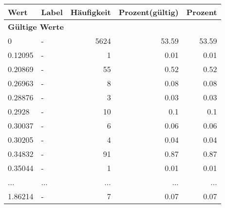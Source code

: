      \begin{longtable}{lXrrr}
     \toprule
     \textbf{Wert} & \textbf{Label} & \textbf{Häufigkeit} & \textbf{Prozent(gültig)} & \textbf{Prozent} \\
     \endhead
     \midrule
     \multicolumn{5}{l}{\textbf{Gültige Werte}}\\
        0 & \multicolumn{1}{X}{-} & %
          \num{5624} &
          \num[round-mode=places,round-precision=2]{53,59} &
          \num[round-mode=places,round-precision=2]{53,59} \\
        0.12095 & \multicolumn{1}{X}{-} & %
          \num{1} &
          \num[round-mode=places,round-precision=2]{0,01} &
          \num[round-mode=places,round-precision=2]{0,01} \\
        0.20869 & \multicolumn{1}{X}{-} & %
          \num{55} &
          \num[round-mode=places,round-precision=2]{0,52} &
          \num[round-mode=places,round-precision=2]{0,52} \\
        0.26963 & \multicolumn{1}{X}{-} & %
          \num{8} &
          \num[round-mode=places,round-precision=2]{0,08} &
          \num[round-mode=places,round-precision=2]{0,08} \\
        0.28876 & \multicolumn{1}{X}{-} & %
          \num{3} &
          \num[round-mode=places,round-precision=2]{0,03} &
          \num[round-mode=places,round-precision=2]{0,03} \\
        0.2928 & \multicolumn{1}{X}{-} & %
          \num{10} &
          \num[round-mode=places,round-precision=2]{0,1} &
          \num[round-mode=places,round-precision=2]{0,1} \\
        0.30037 & \multicolumn{1}{X}{-} & %
          \num{6} &
          \num[round-mode=places,round-precision=2]{0,06} &
          \num[round-mode=places,round-precision=2]{0,06} \\
        0.30205 & \multicolumn{1}{X}{-} & %
          \num{4} &
          \num[round-mode=places,round-precision=2]{0,04} &
          \num[round-mode=places,round-precision=2]{0,04} \\
        0.34832 & \multicolumn{1}{X}{-} & %
          \num{91} &
          \num[round-mode=places,round-precision=2]{0,87} &
          \num[round-mode=places,round-precision=2]{0,87} \\
        0.35044 & \multicolumn{1}{X}{-} & %
          \num{1} &
          \num[round-mode=places,round-precision=2]{0,01} &
          \num[round-mode=places,round-precision=2]{0,01} \\
       ... & ... & ... & ... & ... \\
        1.86214 & \multicolumn{1}{X}{-} & %
          \num{7} &
          \num[round-mode=places,round-precision=2]{0,07} &
          \num[round-mode=places,round-precision=2]{0,07} \\


\end{longtable}
